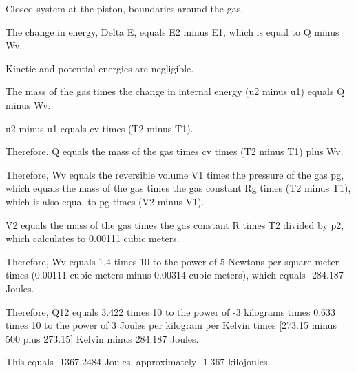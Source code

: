 Closed system at the piston, boundaries around the gas,

The change in energy, Delta E, equals E2 minus E1, which is equal to Q minus Wv.

Kinetic and potential energies are negligible.

The mass of the gas times the change in internal energy (u2 minus u1) equals Q minus Wv.

u2 minus u1 equals cv times (T2 minus T1).

Therefore, Q equals the mass of the gas times cv times (T2 minus T1) plus Wv.

Therefore, Wv equals the reversible volume V1 times the pressure of the gas pg, which equals the mass of the gas times the gas constant Rg times (T2 minus T1), which is also equal to pg times (V2 minus V1).

V2 equals the mass of the gas times the gas constant R times T2 divided by p2, which calculates to 0.00111 cubic meters.

Therefore, Wv equals 1.4 times 10 to the power of 5 Newtons per square meter times (0.00111 cubic meters minus 0.00314 cubic meters), which equals -284.187 Joules.

Therefore, Q12 equals 3.422 times 10 to the power of -3 kilograms times 0.633 times 10 to the power of 3 Joules per kilogram per Kelvin times [273.15 minus 500 plus 273.15] Kelvin minus 284.187 Joules.

This equals -1367.2484 Joules, approximately -1.367 kilojoules.